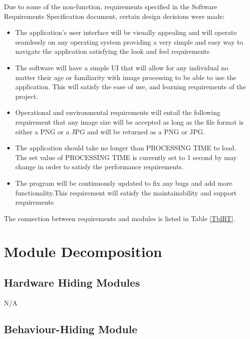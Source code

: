 \documentclass[12pt, titlepage]{article}
\begin{document}
Due to some of the non-function, requirements specified in the Software Requirements Specification document, certain design decisions were made:\\
\begin{itemize}
\item The application’s user interface will be visually appealing and will operate seamlessly on any operating system providing a very simple and easy way to navigate the application satisfying the look and feel requirements\\
\item The software will have a simple UI that will allow for any individual no matter their age or familiarity with image processing to be able to use the application. This will satisfy the ease of use, and learning requirements of the project.
\item Operational and environmental requirements will entail the following requirement that any image size will be accepted as long as the file format is either a PNG or a JPG and will be returned as a PNG or JPG. 
\item The application should take no longer than PROCESSING TIME to load. The set value of PROCESSING TIME is currently set to 1 second by may change in order to satisfy the performance requirements.
\item The program will be continuously updated to fix any bugs and add more functionality.This requirement will satisfy the maintainability and support requirements
\end{itemize}

The connection between requirements and modules is listed in Table \ref{TblRT}.

\section{Module Decomposition} 

\subsection{Hardware Hiding Modules}

\begin{description}
\item N/A
\end{description}

\subsection{Behaviour-Hiding Module}
\end{document}
